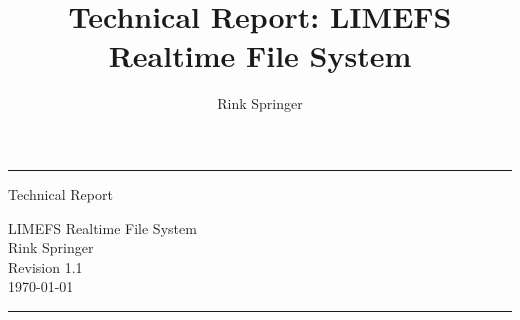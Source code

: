 \documentclass[a4paper,11pt]{book}
\author{Rink Springer}
\title{Technical Report: LIMEFS Realtime File System}
\begin{document}
\frontmatter

\begin{titlepage}
\hrule
\vspace*{\fill}
\begin{center}
{\Huge Technical Report} \\
\vspace{2cm}
\begin{figure}[htb]
\begin{center}
\end{center}
\end{figure}
LIMEFS Realtime File System\\
\vspace{2cm}
{\large Rink Springer}\\
\vspace{2cm}
Revision 1.1\\
\today\\
\vspace{2cm}
\end{center}
\vspace*{\fill}
\hrule
\end{titlepage}



\tableofcontents
\listoffigures





\mainmatter













\backmatter
\printindex
\end{document}
